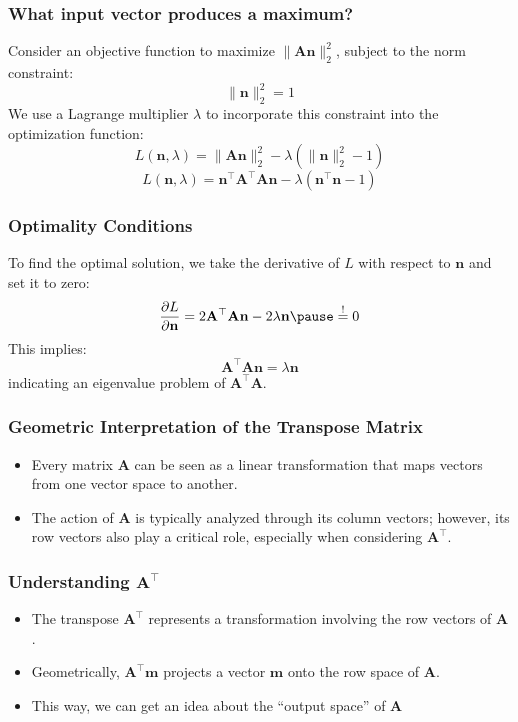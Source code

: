 \documentclass[aspectratio=169]{beamer}
\begin{document}
\begin{frame}
\frametitle{What input vector produces a maximum?}
Consider an objective function to maximize \( \| \mathbf{A} \mathbf{n} \|_2^2\), subject to the norm constraint:
\[
\|\mathbf{n}\|_2^2 = 1
\] \pause
We use a Lagrange multiplier \( \lambda \) to incorporate this constraint into the optimization function:
\[
L(\mathbf{n}, \lambda) = \| \mathbf{A} \mathbf{n} \|_2^2 - \lambda (\|\mathbf{n}\|_2^2 - 1)
\]
\pause
\[
L(\mathbf{n}, \lambda) = \mathbf{n}^\top \mathbf{A}^\top \mathbf{A} \mathbf{n} - \lambda (\mathbf{n}^\top \mathbf{n} - 1)
\]

\end{frame}

\begin{frame}
\frametitle{Optimality Conditions}
To find the optimal solution, we take the derivative of \( L \) with respect to \( \mathbf{n} \) and set it to zero:
\[
\frac{\partial L}{\partial \mathbf{n}} = 2 \mathbf{A}^\top \mathbf{A} \mathbf{n} - 2 \lambda \mathbf{n} \pause \overset{!}{=} 0
\] \pause
This implies:
\[
\mathbf{A}^\top \mathbf{A} \mathbf{n} = \lambda \mathbf{n}
\] \pause
indicating an eigenvalue problem of $\mathbf{A}^\top \mathbf{A}$.
\end{frame}


\begin{frame}
\frametitle{Geometric Interpretation of the Transpose Matrix}
\begin{itemize}
    \item Every matrix \( \mathbf{A} \) can be seen as a linear transformation that maps vectors from one vector space to another.
    \item The action of \( \mathbf{A} \) is typically analyzed through its column vectors; however, its row vectors also play a critical role, especially when considering \( \mathbf{A}^\top \).
\end{itemize}
\end{frame}

\begin{frame}
\frametitle{Understanding \( \mathbf{A}^\top \)}
\pause
\begin{itemize}
    \item The transpose \( \mathbf{A}^\top \) represents a transformation involving the row vectors of \( \mathbf{A} \).
    \item Geometrically, \( \mathbf{A}^\top \mathbf{m} \) projects a vector \( \mathbf{m} \) onto the row space of \( \mathbf{A} \).
    \item This way, we can get an idea about the ``output space'' of $\mathbf{A}$
\end{itemize}
\end{frame}
\end{document}
